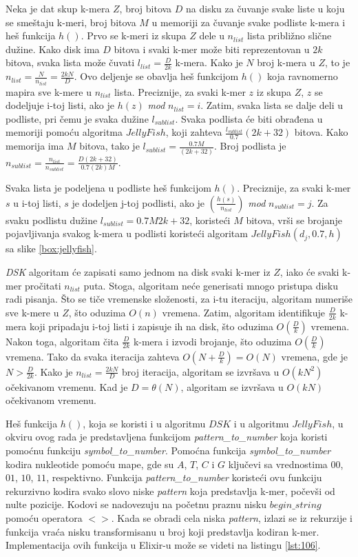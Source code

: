 \documentclass[12pt,oneside]{memoir}
\begin{document}
Neka je dat skup k-mera $Z$, broj bitova $D$ na disku za čuvanje svake liste u koju se smeštaju k-meri, broj bitova $M$ u memoriji za čuvanje svake podliste k-mera i heš funkcija $h()$. Prvo se k-meri iz skupa $Z$ dele u $n_{list}$ lista približno slične dužine. Kako disk ima $D$ bitova i svaki k-mer može biti reprezentovan u $2k$ bitova, svaka lista može čuvati $l_{list} =  \frac{D}{2k}$ k-mera. Kako je $N$ broj k-mera u $Z$, to je $n_{list} = \frac{N}{n_{list}} = \frac{2kN}{D}$. Ovo deljenje se obavlja heš funkcijom $h()$ koja ravnomerno mapira sve k-mere u $n_{list}$ lista. Preciznije, za svaki k-mer $z$ iz skupa $Z$, $z$ se dodeljuje i-toj listi, ako je $h(z)$ \textit{mod} $n_{list} = i$. Zatim, svaka lista se dalje deli u podliste, pri čemu je svaka dužine $l_{sublist}$. Svaka podlista će biti obrađena u memoriji pomoću algoritma $JellyFish$, koji zahteva $\frac{l_{sublist}}{0.7}(2k +32)$ bitova. Kako memorija ima $M$ bitova, tako je $l_{sublist} = \frac{0.7M}{(2k + 32)}$. Broj podlista je  $n_{sublist} = \frac{n_{list}}{n_{sublist}} = \frac{D(2k + 32)}{0.7(2k)M}$. 

Svaka lista je podeljena u podliste heš funkcijom $h()$. Preciznije, za svaki k-mer $s$ u i-toj listi, $s$ je dodeljen j-toj podlisti, ako je $(\frac{h(s)}{n_{list}})$ \textit{mod} $n_{sublist} = j$. Za svaku podlistu dužine $l_{sublist} = {0.7M}{2k + 32}$, koristeći $M$ bitova,  vrši se brojanje pojavljivanja svakog k-mera u podlisti koristeći algoritam $JellyFish(d_j, 0.7, h)$ sa slike \ref{box:jellyfish}.

\textit{DSK} algoritam će zapisati samo jednom na disk svaki k-mer iz $Z$, iako će svaki k-mer pročitati $n_{list}$ puta. Stoga, algoritam neće generisati mnogo pristupa disku radi pisanja. Što se tiče vremenske složenosti, za i-tu iteraciju, algoritam numeriše sve k-mere u $Z$, što oduzima $O(n)$ vremena. Zatim, algoritam identifikuje $\frac{D}{2k}$ k-mera koji pripadaju i-toj listi i zapisuje ih na disk, što oduzima $O(\frac{D}{k})$ vremena. Nakon toga, algoritam  čita $\frac{D}{2k}$ k-mera i izvodi brojanje, što oduzima $O(\frac{D}{k})$ vremena. Tako da svaka iteracija zahteva $O(N + \frac{D}{k}) = O(N)$ vremena, gde je $N > \frac{D}{2k}$. Kako je $n_{list} = \frac{2kN}{D}$ broj iteracija, algoritam se izvršava u $O(kN^2)$ očekivanom vremenu. Kad je $D = \theta(N)$, algoritam se izvršava u $O(kN)$ očekivanom vremenu.

Heš funkcija $h()$, koja se koristi i u algoritmu $DSK$ i u algoritmu $JellyFish$, u okviru ovog rada je predstavljena funkcijom \textit{pattern\_to\_number} koja koristi pomoćnu funkciju \textit{symbol\_to\_number}. Pomoćna funkcija \textit{symbol\_to\_number} kodira nukleotide pomoću mape, gde su $A$, $T$, $C$ i $G$ ključevi sa vrednostima $00$, $01$, $10$, $11$, respektivno. Funkcija \textit{pattern\_to\_number} koristeći ovu funkciju rekurzivno kodira svako slovo niske \textit{pattern} koja predstavlja k-mer, počevši od nulte pozicije. Kodovi se nadovezuju na početnu praznu nisku $begin\_string$ pomoću operatora $<>$. Kada se obradi cela niska \textit{pattern}, izlazi se iz rekurzije i funkcija vraća nisku transformisanu u broj  koji predstavlja kodiran k-mer. Implementacija ovih funkcija u Elixir-u može se videti na listingu \ref{lst:106}.
\end{document}
